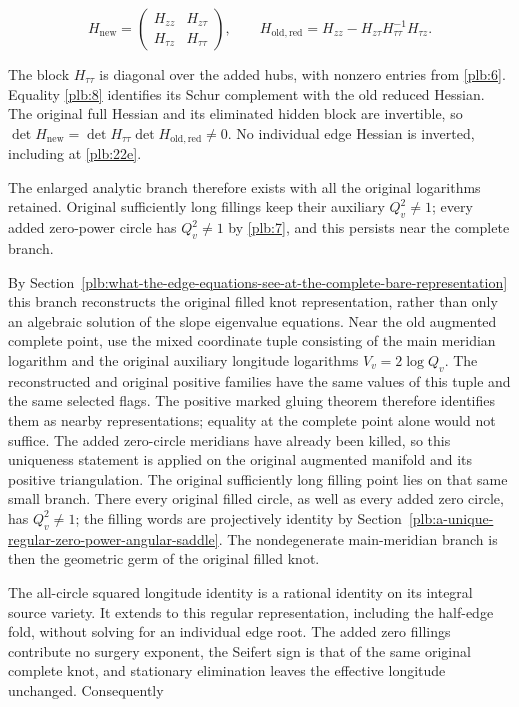 \begin{equation}\label{plb:23a}
H_{\mathrm{new}}=
 \begin{pmatrix}
 H_{zz}&H_{z\tau}\\ H_{\tau z}&H_{\tau\tau}
 \end{pmatrix},\qquad
 H_{\mathrm{old,red}}
   =H_{zz}-H_{z\tau}H_{\tau\tau}^{-1}H_{\tau z}.
\end{equation}

The block \(H_{\tau\tau}\) is diagonal over the added hubs, with
nonzero entries from \eqref{plb:6}. Equality \eqref{plb:8} identifies its Schur
complement with the old reduced Hessian. The original full Hessian
and its eliminated hidden block are invertible, so
\(\det H_{\mathrm{new}}
 =\det H_{\tau\tau}\det H_{\mathrm{old,red}}\ne0\).
No individual edge Hessian is inverted, including at \eqref{plb:22e}.

The enlarged analytic branch therefore exists with all the original
logarithms retained. Original sufficiently long fillings keep their
auxiliary \(Q_v^2\ne1\); every added zero-power circle has
\(Q_v^2\ne1\) by \eqref{plb:7}, and this persists near the complete branch.

By Section~\ref{plb:what-the-edge-equations-see-at-the-complete-bare-representation} this branch reconstructs the original filled knot representation, rather than only an algebraic solution of the slope eigenvalue equations. Near the old augmented complete point, use the mixed coordinate tuple
consisting of the main meridian logarithm and the original auxiliary
longitude logarithms $V_v=2\log Q_v$. The reconstructed and original
positive families have the same values of this tuple and the same
selected flags. The positive marked gluing theorem therefore identifies
them as nearby representations; equality at the complete point alone
would not suffice. The added zero-circle meridians have already been
killed, so this uniqueness statement is applied on the original augmented
manifold and its positive triangulation. The original sufficiently long filling point lies on that same small branch. There every original filled circle, as well as every added zero circle, has \(Q_v^2\ne1\); the filling words are projectively identity by Section~\ref{plb:a-unique-regular-zero-power-angular-saddle}. The nondegenerate main-meridian branch is then the geometric germ of the original filled knot.

The all-circle squared longitude identity is a rational identity on its integral source variety. It extends to this regular representation, including the half-edge fold, without solving for an individual edge root. The added zero fillings contribute no surgery exponent, the Seifert sign is that of the same original complete knot, and stationary elimination leaves the effective longitude unchanged. Consequently

